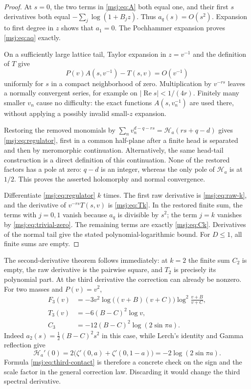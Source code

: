 \begin{proof}
At $s=0$, the two terms in \eqref{msj:eq:A} both equal one, and their
first $s$ derivatives both equal $-\sum_j\log(1+B_jz)$. Thus
$a_q(s)=O(s^2)$. Expansion to first degree in $z$ shows that $a_1=0$.
The Pochhammer expansion proves \eqref{msj:eq:aq} exactly.

On a sufficiently large lattice tail, Taylor expansion in $z=v^{-1}$
and the definition of $T$ give
\[
 P(v)A(s,v^{-1})-T(s,v)=O(v^{-1})
\]
uniformly for $s$ in a compact neighborhood of zero. Multiplication by
$v^{-rs}$ leaves a normally convergent series, for example on
$|\operatorname{Re}s|<1/(4r)$. Finitely many smaller $v_n$ cause no
difficulty: the exact functions $A(s,v_n^{-1})$ are used there,
without applying a possibly invalid small-$z$ expansion.

Restoring the removed monomials by
$\sum_n v_n^{d-q-rs}=\mathcal H_a(rs+q-d)$ gives
\eqref{msj:eq:regulator}, first in a common half-plane after a finite
head is separated and then by meromorphic continuation. Alternatively,
the same head-tail construction is a direct definition of this
continuation. None of the restored factors has a pole at zero:
$q-d$ is an integer, whereas the only pole of $\mathcal H_a$ is at
$1/2$. This proves the asserted holomorphy and normal convergence.

Differentiate \eqref{msj:eq:regulator} $k$ times. The first raw
derivative is \eqref{msj:eq:raw-k}, and the derivative of
$v^{-rs}T(s,v)$ is \eqref{msj:eq:Tk}. In the restored finite sum,
the terms with $j=0,1$ vanish because $a_q$ is divisible by $s^2$;
the term $j=k$ vanishes by \eqref{msj:eq:trivial-zero}. The remaining
terms are exactly \eqref{msj:eq:Ck}. Derivatives of the normal tail
give the stated polynomial-logarithmic bound. For $D\le1$, all finite
sums are empty.
\end{proof}

The second-derivative theorem follows immediately: at $k=2$ the
finite sum $C_2$ is empty, the raw derivative is the pairwise square,
and $T_2$ is precisely its polynomial part. At the third derivative
the correction can already be nonzero. For two masses and $P(v)=v^2$,
\begin{align}
 F_3(v)&=-3v^2\log\bigl((v+B)(v+C)\bigr)
                         \log^2\frac{v+B}{v+C},
 \label{msj:eq:third-raw}\\
 T_3(v)&=-6(B-C)^2\log v,
 \label{msj:eq:third-subtraction}\\
 C_3&=-12(B-C)^2\log(2\sin\pi a).
 \label{msj:eq:third-contact}
\end{align}
Indeed $a_2(s)=\tfrac12(B-C)^2s^2$ in this case, while Lerch's
identity and Gamma reflection give
\[
 \mathcal H_a'(0)=2\bigl(\zeta'(0,a)+\zeta'(0,1-a)\bigr)
                 =-2\log(2\sin\pi a).
\]
Formula \eqref{msj:eq:third-contact} is therefore a concrete check on
the sign and the scale factor in the general correction law. Discarding
it would change the third spectral derivative.


